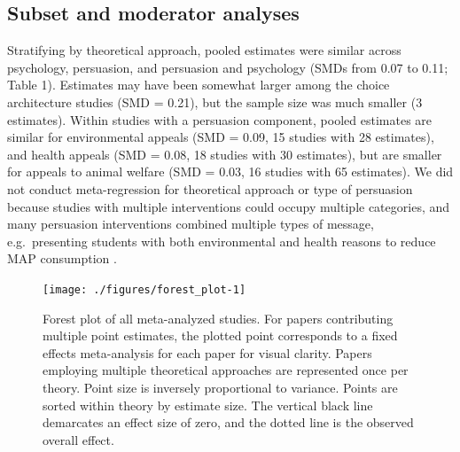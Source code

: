 \documentclass[sn-nature,referee,lineno,pdflatex]{sn-jnl}
\begin{document}
\subsection{Subset and moderator analyses}\label{Sec2.2}

Stratifying by theoretical approach, pooled estimates were similar
across psychology, persuasion, and persuasion and psychology (SMDs from
0.07 to 0.11; Table 1). Estimates may have been somewhat larger among
the choice architecture studies (SMD = 0.21), but the sample size was
much smaller (3 estimates). Within studies with a persuasion component,
pooled estimates are similar for environmental appeals (SMD = 0.09, 15
studies with 28 estimates), and health appeals (SMD = 0.08, 18 studies
with 30 estimates), but are smaller for appeals to animal welfare (SMD =
0.03, 16 studies with 65 estimates). We did not conduct meta-regression
for theoretical approach or type of persuasion because studies with
multiple interventions could occupy multiple categories, and many
persuasion interventions combined multiple types of message,
e.g.~presenting students with both environmental and health reasons to
reduce MAP consumption \citep{jalil2023}.

\begin{figure}[H]

{\centering \texttt{[image: ./figures/forest\_plot-1]} 

}

\caption{Forest plot of all meta-analyzed studies. For papers contributing multiple point estimates, the plotted point corresponds to a fixed effects meta-analysis for each paper for visual clarity. Papers employing multiple theoretical approaches are represented once per theory. Point size is inversely proportional to variance. Points are sorted within theory by estimate size. The vertical black line demarcates an effect size of zero, and the dotted line is the observed overall effect.}\label{fig:forest_plot}
\end{figure}
\end{document}
